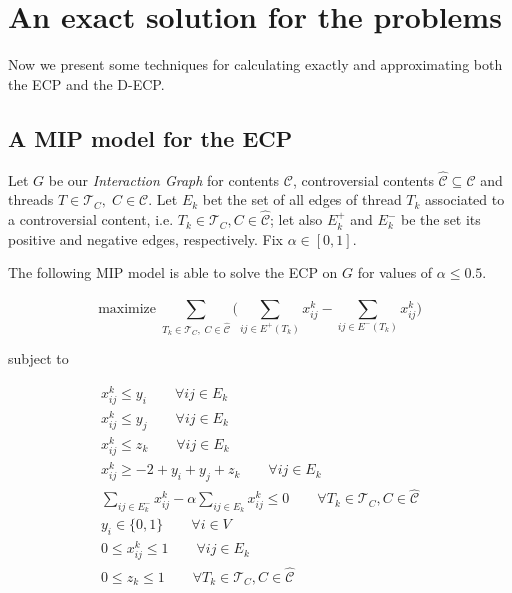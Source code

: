 \section{An exact solution for the problems}%
\label{sec:solving_the_problem}

Now we present some techniques for calculating exactly and approximating both
the \acrshort{ECP} and the \acrshort{D-ECP}.

\subsection{A MIP model for the \acrshort{ECP}}%
\label{sub:a_mip_model_for_the_ecp}

Let $G$ be our \emph{Interaction Graph} for contents $\mathcal{C} $,
controversial contents $\mathcal{\hat{C}} \subseteq \mathcal{C} $ and
threads $T \in \mathcal{T}_{C}, \; C \in \mathcal{C} $. Let $E_k$ bet the set
of all edges of thread $T_k$ associated to a controversial content, i.e. $T_{k}
	\in \mathcal{T}_{C}, C \in \mathcal{\hat{C}}$; let also $E^{+}_k $
and $E^{-}_k $ be the set its positive and negative edges, respectively. Fix $\alpha \in [0, 1]$.

The following \acrshort{MIP} model is able to solve the \acrshort{ECP} on $G$
for values of $\alpha \leq 0.5$.

\begin{equation}
	\label{eq:ecp-exact1}
	\text{maximize} \; \sum_{ T_{k} \in \mathcal{T}_{C}, \; C \in
		\mathcal{\hat{C}} } \big( \sum^{}_{ij \in E^{+} (T_{k})} x_{ij}
		^{k} - \sum_{ij \in E^{-} (T_{k})} x_{ij} ^{k} \big)
\end{equation} \begin{center} subject to \end{center}
\begin{gather}
	\label{eq:ecp-v1}
	x _{ij}^{k}  \leq y_i \quad\quad \forall ij \in E_k  \\
	\label{eq:ecp-v2}
	x _{ij}^{k}  \leq y_j \quad\quad \forall ij \in E_k \\
	\label{eq:ecp-t1}
	x _{ij}^{k}  \leq z_k \quad\quad \forall ij \in E_k \\
	\label{eq:ecp-e1}
	x _{ij} ^{k} \geq - 2 + y_i + y_j + z_k \quad\quad \forall ij \in E_k \\
	\label{eq:ecp-alpha-constraint1}
	\sum^{}_{ij \in E_k^{-} } x_{ij}^{k}  - \alpha \sum^{}_{ij \in E_k}
	x_{ij} ^{k}  \leq 0 \quad\quad \forall T_{k} \in \mathcal{T} _{C}, C \in
	\hat{\mathcal{C}} \\
	\label{eq:ecp-vertex-def1}
	y _{i} \in  \{0, 1\} \quad\quad \forall i \in V \\
	\label{eq:ecp-edge-def1}
	0 \leq x _{ij} ^{k}  \leq 1 \quad\quad \forall ij \in E_k \\
	\label{eq:ecp-thread-def1}
	0 \leq z _{k} \leq 1 \quad\quad \forall T_{k} \in \mathcal{T} _{C}, C \in
	\hat{\mathcal{C}}
\end{gather}


